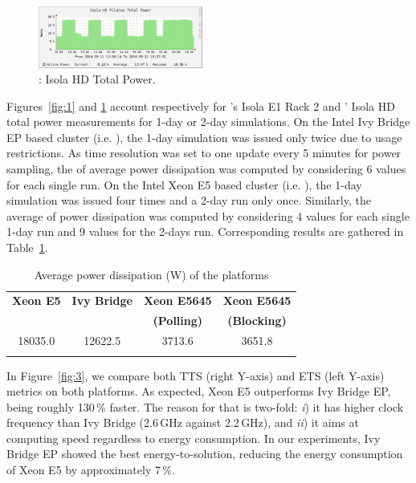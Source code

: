 \begin{figure}[htbf]
  \begin{center}
    \includegraphics[width=0.48\textwidth]{Figs/NRJ_benchmark_Pilatus.eps}
    \caption{\pilat: Isola HD Total Power.}
    \label{fig:2}
  \end{center}
\end{figure}

Figures~\ref{fig:1}   and   \ref{fig:2}   account   respectively   for
\monch's Isola E1 Rack  2 and \pilat' Isola HD total
power measurements for  1-day or 2-day simulations. On  the Intel Ivy
Bridge EP  based cluster (i.e.  \monch),  the 1-day simulation
was issued  only twice due  to usage restrictions. As  time resolution
was set to one update every  5 minutes for power sampling, the of average
power dissipation was computed by considering 6 values for each single
run.  On the Intel Xeon E5 based cluster (i.e.  \pilat), the
1-day simulation  was issued  four times and  a 2-day run  only once.
Similarly, the average of power dissipation was computed by considering 4
values  for  each  single  1-day  run  and 9  values  for  the  2-days
run. Corresponding results are gathered in Table~\ref{tab:3}.

\begin{table}[htbf]
  \begin{center}
    \caption{Average power dissipation (W) of the platforms}
    \label{tab:3}
    \begin{tabular}{cccc}
      \hline\noalign{\smallskip}
      \textbf{\scriptsize{Xeon E5}} & \textbf{\scriptsize{Ivy Bridge}} & \textbf{\scriptsize{Xeon  E5645}} & \textbf{\scriptsize{Xeon  E5645}}\\
      & & \textbf{\scriptsize{(Polling)}} & \textbf{\scriptsize{(Blocking)}} \\
      \noalign{\smallskip}\hline\noalign{\smallskip}
      18035.0 & 12622.5 & 3713.6 & 3651.8 \\ 
      \noalign{\smallskip}\hline
    \end{tabular}
  \end{center}
\end{table}

In  Figure~\ref{fig:3}, we  compare both  TTS (right  Y-axis)  and ETS
(left  Y-axis)  metrics  on  both  platforms.  As  expected,  Xeon  E5
outperforms Ivy Bridge EP, being  roughly 130\,\% faster.  The reason for
that is  two-fold: \emph{i}) it has  higher clock frequency  than Ivy Bridge
(2.6\,GHz  against  2.2\,GHz),  and  \emph{ii})  it  aims at  computing  speed
regardless to  energy consumption.  In our experiments,  Ivy Bridge EP
showed the best energy-to-solution, reducing the energy consumption of
Xeon E5 by approximately 7\,\%.

